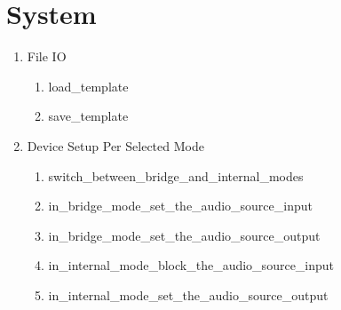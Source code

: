 \section{System}

\begin{enumerate}
	\item File IO
	\begin{enumerate}
		\item load\_template
		\item save\_template
	\end{enumerate}

	\item Device Setup Per Selected Mode
	\begin{enumerate}
		\item switch\_between\_bridge\_and\_internal\_modes
		\item in\_bridge\_mode\_set\_the\_audio\_source\_input
		\item in\_bridge\_mode\_set\_the\_audio\_source\_output
		\item in\_internal\_mode\_block\_the\_audio\_source\_input
		\item in\_internal\_mode\_set\_the\_audio\_source\_output
	\end{enumerate}

\begin{comment}
	\item Audio Routing
	\begin{enumerate}
		\item chain\_audio\_effects\_in\_series
		\item split\_audio\_stream\_into\_two\_streams

	\end{enumerate}

	\item Audio Control
	\begin{enumerate}
		\item adjust\_audio\_effect\_parameters\_during\_audio\_stream
		\item audio\_control\_modules\_adjust\_the\_paramters\_of\_audio\_effect
	\end{enumerate}
\end{comment}




\end{enumerate}